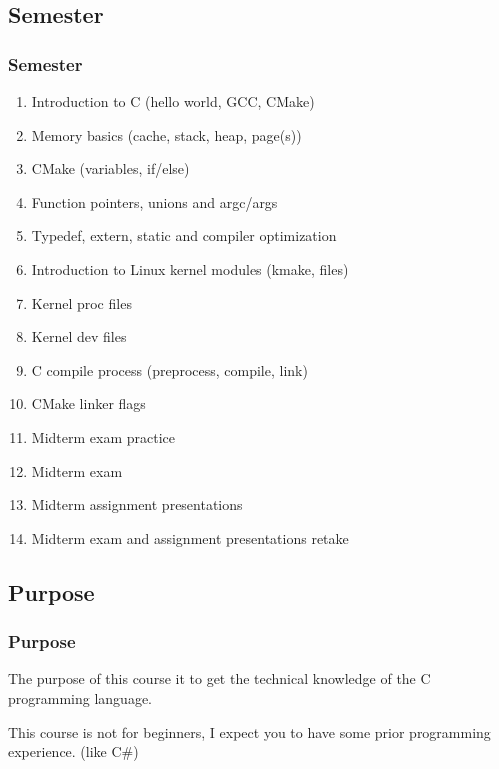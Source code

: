 \documentclass[
	11pt, %
]{beamer}
\begin{document}
\begin{frame}
    \subsection{Semester}
	\frametitle{Semester}

	\begin{enumerate}
        \item Introduction to C (hello world, GCC, CMake)
        \item Memory basics (cache, stack, heap, page(s))
        \item CMake (variables, if/else)
        \item Function pointers, unions and argc/args
        \item Typedef, extern, static and compiler optimization
        \item Introduction to Linux kernel modules (kmake, files)
        \item Kernel proc files
        \item Kernel dev files
        \item C compile process (preprocess, compile, link)
        \item CMake linker flags
        \item Midterm exam practice
        \item Midterm exam
        \item Midterm assignment presentations
        \item Midterm exam and assignment presentations retake
	\end{enumerate}

\end{frame}

\begin{frame}
    \subsection{Purpose}
	\frametitle{Purpose}

    The purpose of this course it to get the technical knowledge of the C programming language.

    \bigskip

    This course is not for beginners, I expect you to have some prior programming experience. (like C\#)

\end{frame}


\end{document}
